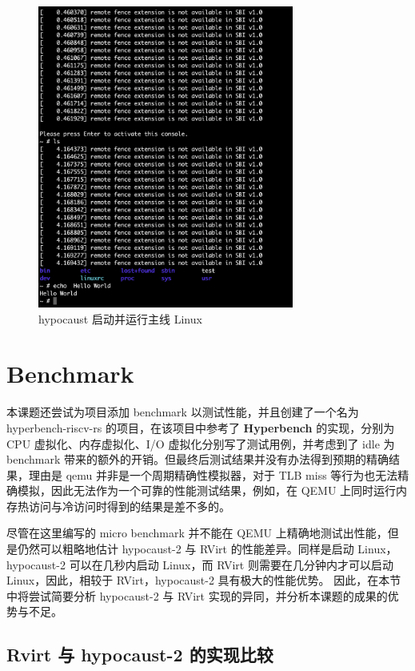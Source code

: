 \begin{figure}[]
    \centering
    \includegraphics[width=0.75\textwidth]{thesis-images/hypocaust-2-linux.png}
    \caption{hypocaust 启动并运行主线 Linux}\label{fig:hypocaust-2-linux}
\end{figure}

\section{Benchmark}
本课题还尝试为项目添加 benchmark 以测试性能，并且创建了一个名为 hyperbench-riscv-rs 的项目，在该项目中参考了 \textbf{Hyperbench} \cite{wei2019hyperbench} 的实现，分别为 CPU 虚拟化、内存虚拟化、I/O 虚拟化分别写了测试用例，并考虑到了 idle 为 benchmark 带来的额外的开销。但最终后测试结果并没有办法得到预期的精确结果，理由是 qemu 并非是一个周期精确性模拟器，对于 TLB miss 等行为也无法精确模拟，因此无法作为一个可靠的性能测试结果，例如，在 QEMU 上同时运行内存热访问与冷访问时得到的结果是差不多的。

尽管在这里编写的 micro benchmark 并不能在 QEMU 上精确地测试出性能，但是仍然可以粗略地估计 hypocaust-2 与 RVirt 的性能差异。同样是启动 Linux，hypocaust-2 可以在几秒内启动 Linux，而 RVirt 则需要在几分钟内才可以启动 Linux，因此，相较于 RVirt，hypocaust-2 具有极大的性能优势。
因此，在本节中将尝试简要分析 hypocaust-2 与 RVirt 实现的异同，并分析本课题的成果的优势与不足。

\subsection{Rvirt 与 hypocaust-2 的实现比较}

